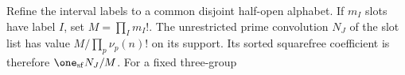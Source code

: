 Refine the interval labels to a common disjoint half-open alphabet.
If $m_I$ slots have label $I$, set $M=\prod_I m_I!$.
The unrestricted prime convolution $N_J$ of the slot list has value
$M/\prod_p\nu_p(n)!$ on its support.  Its sorted squarefree coefficient
is therefore $\one_{\mathrm{sf}}N_J/M$.  For a fixed three-group
